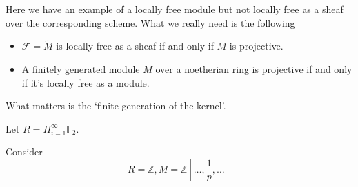 \documentclass[main.tex]{subfiles}
\begin{document}
\begin{example}
Here we have an example of a locally free module but not locally free as a sheaf over the corresponding scheme.  What we really need is the following 
\begin{itemize}
\item $\mathscr{F}=\widetilde{M}$ is locally free as a sheaf if and only if $M$ is projective.
\item A finitely generated module $M$ over a noetherian ring is projective if and only if it's locally free as a module.
\end{itemize}
\end{example}
\begin{remark}
What matters is the `finite generation of the kernel'.
\end{remark}

\begin{example}
Let $R=\Pi_{i=1}^{\infty}\mathbb{F}_{2}$.
\end{example}

\begin{example}
Consider $$R=\mathbb{Z}, M=\mathbb{Z}[\dots, \frac{1}{p}, \dots]$$
\end{example}
\end{document}
